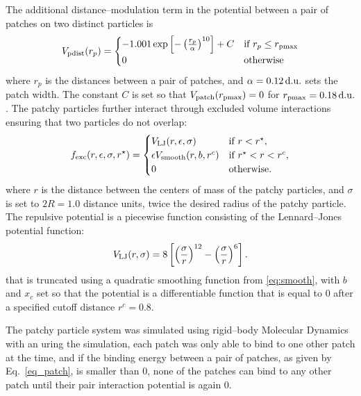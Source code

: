 The additional distance--modulation term in the potential between a pair of patches on two distinct particles is 
\begin{equation}
    \label{eq_patch}
    V_{\rm pdist}(r_p) =  \begin{cases} 
                          -1.001  \exp{\left[- \left( \frac{r_p}{\alpha} \right)^{10}\right]} + C & \text{if $r_p \leq r_{\rm pmax}  $} \\
                          0 & \text{otherwise}
                        \end{cases}
\end{equation}
where $r_p$ is the distances between a pair of patches, and $\alpha = 0.12\, {\rm d.u.}$ sets the patch width. The constant $C$ is set so that $V_{\rm patch}(r_{\rm pmax}) = 0$ for $r_{\rm pmax} = 0.18\, \rm{d.u.}$. The patchy particles further interact through excluded volume interactions ensuring that two particles do not overlap:
\begin{equation}
    f_{\rm exc}(r,\epsilon,\sigma,r^{\star}) = \begin{cases}
	V_{\rm LJ}(r, \epsilon, \sigma) & \text{if $r < r^{\star} $},\\
	\epsilon V_{\rm smooth} (r, b, r^c) & \text{if $r^{\star} < r < r^c$},\\
	0 & \text{otherwise}.
	\end{cases} 
\end{equation}
where $r$ is the distance between the centers of mass of the patchy particles, and $\sigma$ is set to $2R = 1.0$ distance units, twice the desired radius of the patchy particle.
The repulsive potential is a piecewise function consisting of the Lennard--Jones potential function:
\begin{equation} 
V_{\rm LJ}(r,  \sigma) = 8 \left[ \left(\frac{\sigma}{r}\right) ^{12} - \left(\frac{\sigma}{r}\right) ^{6} \right].
\end{equation}
that is truncated using a quadratic smoothing function from \eqref{eq:smooth}, with $b$ and $x_c$ set so that the potential is a differentiable function that is equal to $0$ after a specified cutoff distance $r^c = 0.8$.  

The patchy particle system was simulated using rigid--body Molecular Dynamics with an uring the simulation, each patch was only able to bind to one other patch at the time, and if the binding energy between a pair of patches, as given by Eq.~\eqref{eq_patch}, is smaller than 0, none of the patches can bind to any other patch until their pair interaction potential is again 0.


